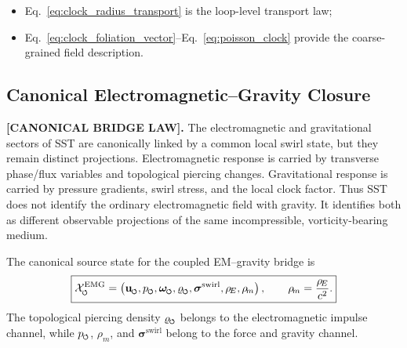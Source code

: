 \documentclass[11pt]{article}
\theoremstyle{definition}
\theoremstyle{plain}
\theoremstyle{remark}
\newcommand{\swirlarrow}{\mathchoice{\mkern-2mu\scriptstyle\boldsymbol{\circlearrowleft}}{\mkern-2mu\scriptstyle\boldsymbol{\circlearrowleft}}{\mkern-2mu\scriptscriptstyle\boldsymbol{\circlearrowleft}}{\mkern-2mu\scriptscriptstyle\boldsymbol{\circlearrowleft}}}
\newcommand{\rhoE}{\rho_{\!E}}
\newcommand{\rhoM}{\rho_{\!m}}
\begin{document}
        \begin{itemize}
            \item Eq.~\eqref{eq:clock_radius_transport} is the loop-level transport law;
            \item Eq.~\eqref{eq:clock_foliation_vector}--Eq.~\eqref{eq:poisson_clock} provide the coarse-grained field description.
        \end{itemize}


    \subsection{Canonical Electromagnetic--Gravity Closure}
        \label{subsec:canonical_em_gravity_closure}

        \textbf{[CANONICAL BRIDGE LAW].} The electromagnetic and gravitational sectors of SST are canonically linked by a common local swirl state, but they remain distinct projections. Electromagnetic response is carried by transverse phase/flux variables and topological piercing changes. Gravitational response is carried by pressure gradients, swirl stress, and the local clock factor. Thus SST does not identify the ordinary electromagnetic field with gravity. It identifies both as different observable projections of the same incompressible, vorticity-bearing medium.

        The canonical source state for the coupled EM--gravity bridge is
        \begin{align}
            \boxed{
            \mathcal{X}^{\mathrm{EMG}}_{\swirlarrow}
            =
            \left(
            \mathbf{u}_{\swirlarrow},
            p_{\swirlarrow},
            \boldsymbol{\omega}_{\swirlarrow},
            \varrho_{\swirlarrow},
            \boldsymbol{\sigma}^{\mathrm{swirl}},
            \rhoE,
            \rhoM
            \right),
            \qquad
            \rhoM=\frac{\rhoE}{c^2}.
            }
            \label{eq:emg_source_state}
        \end{align}
        The topological piercing density \(\varrho_{\swirlarrow}\) belongs to the electromagnetic impulse channel, while \(p_{\swirlarrow}\), \(\rhoM\), and \(\boldsymbol{\sigma}^{\mathrm{swirl}}\) belong to the force and gravity channel.
\end{document}
